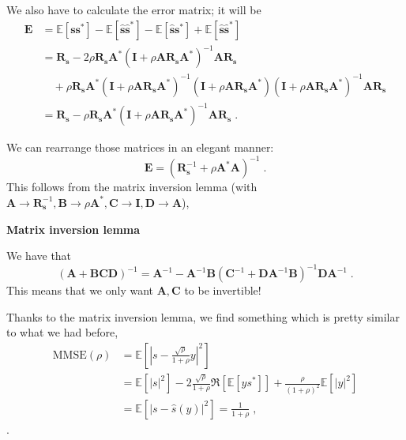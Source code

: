 \documentclass[a4paper, 12pt]{book}
\begin{document}
We also have to calculate the error matrix; it will be
\begin{align*}
\bm{E} &= \mathbb{E}[\bm{s}\bm{s}^*] - \mathbb{E}[\hat{\bm{s}}\hat{\bm{s}}^*] - \mathbb{E}[\hat{\bm{s}}\bm{s}^*] + \mathbb{E}[\hat{\bm{s}}\hat{\bm{s}}^*] \\
&= \bm{R}_{\bm{s}} - 2\rho\bm{R}_{\bm{s}}\bm{A}^*(\bm{I} + \rho\bm{A}\bm{R}_{\bm{s}}\bm{A}^*)^{-1}\bm{A}\bm{R}_{\bm{s}} \\
&\quad + \rho\bm{R}_{\bm{s}}\bm{A}^*(\bm{I} + \rho\bm{A}\bm{R}_{\bm{s}}\bm{A}^*)^{-1}(\bm{I} + \rho\bm{A}\bm{R}_{\bm{s}}\bm{A}^*)(\bm{I} + \rho\bm{A}\bm{R}_{\bm{s}}\bm{A}^*)^{-1}\bm{A}\bm{R}_{\bm{s}} \\
&= \bm{R}_{\bm{s}} - \rho\bm{R}_{\bm{s}}\bm{A}^*(\bm{I} + \rho\bm{A}\bm{R}_{\bm{s}}\bm{A}^*)^{-1}\bm{A}\bm{R}_{\bm{s}} \;.
\end{align*}

We can rearrange those matrices in an elegant manner:
$$
\bm{E} = (\bm{R}_{\bm{s}}^{-1} + \rho \bm{A}^* \bm{A})^{-1} \;.
$$
This follows from the matrix inversion lemma (with $\bm{A} \to \bm{R}_{\bm{s}}^{-1}, \bm{B} \to \rho \bm{A}^*, \bm{C} \to \bm{I}, \bm{D} \to \bm{A}$),

\begin{tcolorbox}[sharp corners, boxrule=0pt, leftrule=2pt, colframe=green!60!black, colback=green!5, left=5pt, top=3pt, bottom=3pt]
    \textbf{Matrix inversion lemma}
    
    We have that
    $$
    (\bm{A} + \bm{B}\bm{C}\bm{D})^{-1} = \bm{A}^{-1} - \bm{A}^{-1}\bm{B}(\bm{C}^{-1} + \bm{D}\bm{A}^{-1}\bm{B})^{-1}\bm{D}\bm{A}^{-1} \;.
    $$
    This means that we only want $\bm{A}, \bm{C}$ to be invertible!
    
    \vspace{0.5em}
\end{tcolorbox}

Thanks to the matrix inversion lemma, we find something which is pretty similar to what we had before,
\begin{align}
\text{MMSE}(\rho) &= \mathbb{E}\left[ \left| s - \frac{\sqrt{\rho}}{1+\rho}y \right|^2 \right] \tag{1.173} \\
&= \mathbb{E}[|s|^2] - 2 \frac{\sqrt{\rho}}{1+\rho} \Re[\mathbb{E}[ys^*]] + \frac{\rho}{(1+\rho)^2}\mathbb{E}[|y|^2] \tag{1.174} \\
&= \mathbb{E}[|s - \hat{s}(y)|^2] = \frac{1}{1+\rho} \;, \tag{1.175}
\end{align}
.
\end{document}
